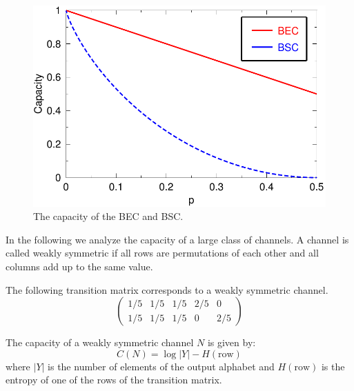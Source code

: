 \begin{figure}[h]
\begin{center}
\includegraphics[width=\linewidth]{figures/becbsc.pdf}
\caption{The capacity of the BEC and BSC.}
\label{fig:becbsc}
\end{center}
\end{figure}
In the following we analyze the capacity of a large class of channels. A channel is called weakly symmetric if all rows are permutations of each other and all columns add up to the same value.
\begin{example}
The following transition matrix corresponds to a weakly symmetric channel.
\begin{equation}
\begin{pmatrix}
1/5 & 1/5 & 1/5 & 2/5 &0\\
1/5 & 1/5 & 1/5 & 0 &2/5
\end{pmatrix}
\end{equation}
\end{example}
\begin{lemma}
The capacity of a weakly symmetric channel $N$ is given by:
\begin{equation}
C(N)=\log|Y|-H(\text{row})
\end{equation}
where $|Y|$ is the number of elements of the output alphabet and $H(\text{row})$ is the entropy of one of the rows of the transition matrix.
\end{lemma}
